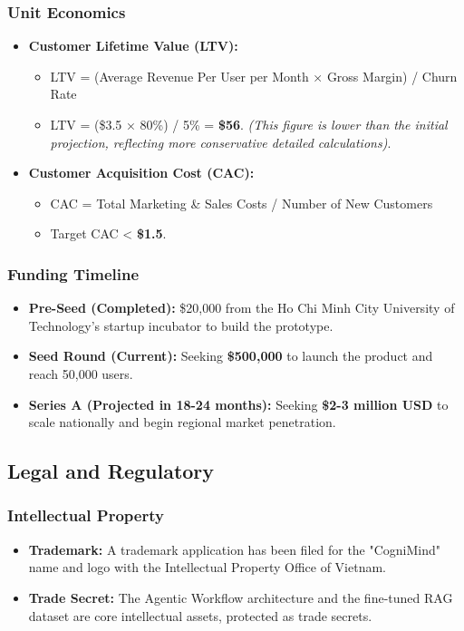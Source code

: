 \subsubsection{Unit Economics}
\begin{itemize}
    \item \textbf{Customer Lifetime Value (LTV):}
    \begin{itemize}
        \item LTV = (Average Revenue Per User per Month × Gross Margin) / Churn Rate
        \item LTV = (\$3.5 × 80\%) / 5\% = \textbf{\$56}. \textit{(This figure is lower than the initial projection, reflecting more conservative detailed calculations)}.
    \end{itemize}
    \item \textbf{Customer Acquisition Cost (CAC):}
    \begin{itemize}
        \item CAC = Total Marketing \& Sales Costs / Number of New Customers
        \item Target CAC < \textbf{\$1.5}.
    \end{itemize}
\end{itemize}

\subsubsection{Funding Timeline}
\begin{itemize}
    \item \textbf{Pre-Seed (Completed):} \$20,000 from the Ho Chi Minh City University of Technology's startup incubator to build the prototype.
    \item \textbf{Seed Round (Current):} Seeking \textbf{\$500,000} to launch the product and reach 50,000 users.
    \item \textbf{Series A (Projected in 18-24 months):} Seeking \textbf{\$2-3 million USD} to scale nationally and begin regional market penetration.
\end{itemize}

\subsection{Legal and Regulatory}

\subsubsection{Intellectual Property}
\begin{itemize}
    \item \textbf{Trademark:} A trademark application has been filed for the "CogniMind" name and logo with the Intellectual Property Office of Vietnam.
    \item \textbf{Trade Secret:} The Agentic Workflow architecture and the fine-tuned RAG dataset are core intellectual assets, protected as trade secrets.
\end{itemize}

